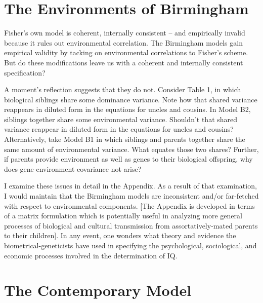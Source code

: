 ﻿\documentclass[12pt]{article}
\begin{document}
\section{The Environments of Birmingham}

Fisher's own model is coherent, internally consistent -- and empirically invalid because it rules out environmental correlation. The Birmingham models gain empirical validity by tacking on environmental correlations to Fisher's scheme. But do these modifications leave us with a coherent and internally consistent specification?

A moment's reflection suggests that they do not. Consider Table 1, in which biological siblings share some dominance variance. Note how that shared variance reappears in diluted form in the equations for uncles and cousins. In Model B2, siblings together share some environmental variance. Shouldn't that shared variance reappear in diluted form in the equations for uncles and cousins? Alternatively, take Model B1 in which siblings and parents together share the same amount of environmental variance. What equates those two shares? Further, if parents provide environment as well as genes to their biological offspring, why does gene-environment covariance not arise?

I examine these issues in detail in the Appendix. As a result of that examination, I would maintain that the Birmingham models are inconsistent and/or far-fetched with respect to environmental components. [The Appendix is developed in terms of a matrix formulation which is potentially useful in analyzing more general processes of biological and cultural transmission from assortatively-mated parents to their children]. In any event, one wonders what theory and evidence the biometrical-geneticists have used in specifying the psychological, sociological, and economic processes involved in the determination of IQ.

\section{The Contemporary Model}
\end{document}
